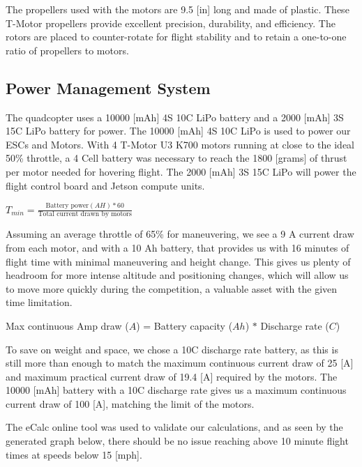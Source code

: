 \documentclass[12pt,letterpaper]{article}
\begin{document}
			The propellers used with the motors are 9.5 [in] long and made of plastic. These T-Motor propellers provide excellent precision, durability, and efficiency. The rotors are placed to counter-rotate for flight stability and to retain a one-to-one ratio of propellers to motors.
	\subsection*{Power Management System}
The quadcopter uses a 10000 [mAh] 4S 10C LiPo battery and a 2000 [mAh] 3S 15C LiPo battery for power. The 10000 [mAh] 4S 10C LiPo is used to power our ESCs and Motors. With 4 T-Motor U3 K700 motors running at close to the ideal 50\% throttle, a 4 Cell battery was necessary to reach the 1800 [grams] of thrust per motor needed for hovering flight. The 2000 [mAh] 3S 15C LiPo will power the flight control board and Jetson compute units.
\begin{center}
	$T_{min} = \frac{\text{Battery power}(AH) * 60}{\text{Total current drawn by motors}}$
\end{center}

Assuming an average throttle of 65\% for maneuvering, we see a 9 A current draw from each motor, and with a 10 Ah battery, that provides us with 16 minutes of flight time with minimal maneuvering and height change. This gives us plenty of headroom for more intense altitude and positioning changes, which will allow us to move more quickly during the competition, a valuable asset with the given time limitation.
\begin{center}
	Max continuous Amp draw ($A$) = Battery capacity ($Ah$) $*$ Discharge rate ($C$)
\end{center}

To save on weight and space, we chose a 10C discharge rate battery, as this is still more than enough to match the maximum continuous current draw of 25 [A] and maximum practical current draw of 19.4 [A] required by the motors. The 10000 [mAh] battery with a 10C discharge rate gives us a maximum continuous current draw of 100 [A], matching the limit of the motors.

The eCalc online tool was used to validate our calculations, and as seen by the generated graph below, there should be no issue reaching above 10 minute flight times at speeds below 15 [mph].

\end{document}
